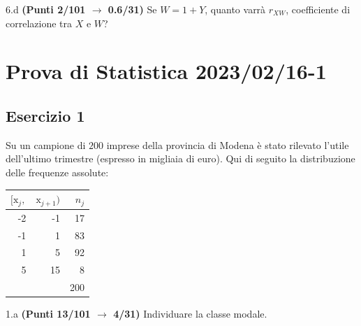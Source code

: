 \documentclass[
  11pt,
]{book}
\theoremstyle{mytheoremstyle}
\theoremstyle{mydefstyle}
\begin{document}
6.d \textbf{(Punti 2/101 \(\rightarrow\) 0.6/31)} Se \(W=1+ Y\), quanto varrà \(r_{XW}\), coefficiente di correlazione tra \(X\) e \(W\)?

\section{Prova di Statistica 2023/02/16-1}\label{prova-di-statistica-20230216-1}

\subsection{Esercizio 1}\label{esercizio-1-22}

Su un campione di \(200\) imprese della provincia di Modena è stato rilevato l'utile dell'ultimo trimestre (espresso in migliaia di euro). Qui di seguito la distribuzione delle frequenze assolute:

\begin{table}[H]
\centering
\begin{tabular}{rrr}
\toprule
$[\text{x}_j,$ & $\text{x}_{j+1})$ & $n_j$\\
\midrule
-2 & -1 & 17\\
-1 & 1 & 83\\
1 & 5 & 92\\
5 & 15 & 8\\
 &  & 200\\
\bottomrule
\end{tabular}
\end{table}

1.a \textbf{(Punti 13/101 \(\rightarrow\) 4/31)} Individuare la classe modale.
\end{document}
